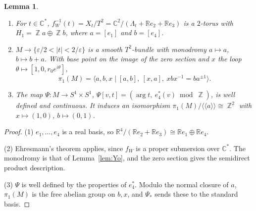 \documentclass{article}
\DeclareMathOperator{\Z}{\mathbb{Z}}
\newtheorem{lemma}[theorem]{Lemma}
\theoremstyle{definition}
\theoremstyle{plain}
\newcommand{\R}{\mathbb{R}}
\newcommand{\C}{\mathbb{C}}
\begin{document}
\begin{lemma}\label{lem:regular}
\begin{enumerate}
\item For $t\in\C^*$, $f_W^{-1}(t)=X_t/T^2=\C^2/(\Lambda_t+\R e_2+\R e_3)$ is a $2$-torus
  with $H_1=\Z a\oplus\Z b$, where $a=[e_1]$ and $b=[e_4]$.
\item $M\to\{\varepsilon/2<|t|<2/\varepsilon\}$ is a smooth $T^2$-bundle with monodromy
  $a\mapsto a$, $b\mapsto b+a$. With base point on the image of the zero section and
  $x$ the loop $\theta\mapsto[1,0,r_0e^{i\theta}]$,
  \[\pi_1(M)=\langle a,b,x\mid [a,b],\ [x,a],\ xbx^{-1}=b a^{\pm1}\rangle.\]
\item The map $\Psi\colon M\to S^1\times S^1$, $\Psi[v,t]=(\arg t,\ e_4^*(v)\bmod\Z)$, is well
  defined and continuous. It induces an isomorphism
  $\pi_1(M)/\langle\!\langle a\rangle\!\rangle\cong\Z^2$ with $x\mapsto(1,0)$, $b\mapsto(0,1)$.
\end{enumerate}
\end{lemma}
\begin{proof}
(1) $e_1,\dots,e_4$ is a real basis, so $\R^4/(\R e_2+\R e_3)\cong\R e_1\oplus\R e_4$.

(2) Ehresmann's theorem applies, since $f_W$ is a proper submersion over $\C^*$. The
monodromy is that of Lemma~\ref{lem:Yo}, and the zero section gives the semidirect
product description.

(3) $\Psi$ is well defined by the properties of $e_4^*$. Modulo the normal closure of
$a$, $\pi_1(M)$ is the free abelian group on $b,x$, and $\Psi_*$ sends these to the
standard basis.
\end{proof}
\end{document}
